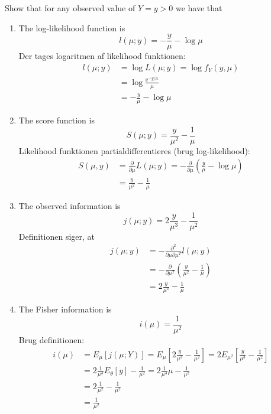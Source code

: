 \documentclass[12pt,a4paper]{report}
\begin{document}
Show that for any observed value of $Y=y>0$ we have that
\begin{enumerate}
\item The log-likelihood function is
\begin{equation}
l(\mu;y)=-\frac{y}{\mu}-\log\mu
\end{equation}
Der tages logaritmen af likelihood funktionen:
\begin{align*}
l(\mu;y)&=\log L(\mu;y)=\log f_Y(y,\mu)\\
&=\log\frac{\mathrm{e}^{-y/\mu}}{\mu}\\
&=-\frac{y}{\mu}-\log\mu
\end{align*}
\item The score function is
\begin{equation}
S(\mu;y)=\frac{y}{\mu^2}-\frac{1}{\mu}
\end{equation}
Likelihood funktionen partialdifferentieres (brug log-likelihood):
\begin{align*}
S(\mu,y)&=\frac{\partial}{\partial\mu}L(\mu;y)=-\frac{\partial}{\partial\mu}\left(\frac{y}{\mu}-\log\mu\right)\\
&=\frac{y}{\mu^2}-\frac{1}{\mu}
\end{align*}
\item The observed information is
\begin{equation}
j(\mu;y)=2\frac{y}{\mu^3}-\frac{1}{\mu^2}
\end{equation}
Definitionen siger, at
\begin{align*}
j(\mu;y)&=-\frac{\partial^2}{\partial\mu\partial\mu^T}l(\mu;y)\\
&=-\frac{\partial}{\partial\mu^T}\left(\frac{y}{\mu^2}-\frac{1}{\mu}\right)\\
&=2\frac{y}{\mu^3}-\frac{1}{\mu}
\end{align*}
\item The Fisher information is
\begin{equation}
i(\mu)=\frac{1}{\mu^2}
\end{equation}
Brug definitionen:
\begin{align*}
i(\mu)&=E_{\mu}\left[j(\mu;Y)\right]=E_{\mu}\left[2\frac{y}{\mu^3}-\frac{1}{\mu^2}\right]=2E_{\mu^2}\left[\frac{y}{\mu^3}-\frac{1}{\mu^2}\right]\\
&=2\frac{1}{\mu^3}E_{\theta}[y]-\frac{1}{\mu^2}=2\frac{1}{\mu^3}\mu-\frac{1}{\mu^2}\\
&=2\frac{1}{\mu^2}-\frac{1}{\mu^2}\\
&=\frac{1}{\mu^2}
\end{align*}
\end{enumerate}
\end{document}
